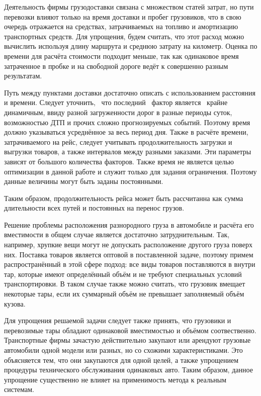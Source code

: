 	Деятельность фирмы грузодоставки связана с множеством статей затрат, но пути перевозки влияют только на время доставки и пробег грузовиков, что в свою очередь отражается на средствах, затрачиваемых на топливо и амортизацию транспортных средств. Для упрощения, будем считать, что этот расход можно вычислить используя длину маршрута и среднюю затрату на километр. Оценка по времени для расчёта стоимости подходит меньше, так как одинаковое время затраченное в пробке и на свободной дороге ведёт к совершенно разным результатам.
	
	Путь между пунктами доставки достаточно описать с использованием расстояния и времени. Следует уточнить, \, что последний \, фактор является \, крайне динамичным, ввиду разной загруженности дорог в разные периоды суток, возможностью ДТП и прочих сложно прогнозируемых событий. Поэтому время должно указываться  усреднённое за весь период дня. Также в расчёте времени, затрачиваемого на рейс, следует учитывать продолжительность загрузки и выгрузки товаров, а также интервалов между разными заказами. Эти параметры зависят от большого количества факторов. Также время не является целью оптимизации в данной работе и служит только для задания ограничения. Поэтому данные величины могут быть заданы постоянными.
	
	Таким образом, продолжительность рейса может быть рассчитанна как сумма длительности всех путей и постоянных на перенос грузов.
	
	Решение проблемы расположения разнородного груза в автомобиле и расчёта его вместимости в общем случае является достаточно затруднительным. Так, например, хрупкие вещи могут не допускать расположение другого груза поверх них. Поставка товаров является оптовой в поставленной задаче, поэтому примем распространённый в этой сфере подход: все виды товаров поставляются в внутри тар, которые имеют определённый объём и не требуют специальных условий транспортировки. В таком случае также можно считать, что грузовик вмещает некоторые тары, если их суммарный объём не превышает заполняемый объём кузова.
	
	Для упрощения решаемой задачи следует также принять, что грузовики и перевозимые тары обладают одинаковой вместимостью и объёмом соотвественно. Транспортные фирмы зачастую действительно закупают или арендуют грузовые автомобили одной модели или разных, но со схожими характеристиками. Это объясняется тем, что они закупаются для одной целей, а также упрощением процедуры технического обслуживания одинаковых авто. Таким образом, данное упрощение существенно не влияет на применимость метода к реальным системам.
	
